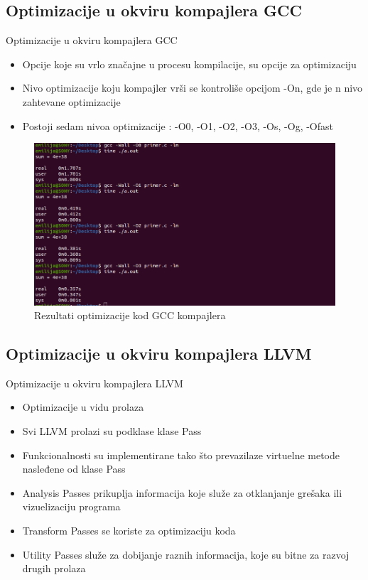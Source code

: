 \documentclass[compress, containsverbatim,mathserif, xcolor=dvipsnames, unicode]{beamer}
\begin{document}
\subsection{Optimizacije u okviru kompajlera GCC}
\begin{frame}{Optimizacije u okviru kompajlera GCC}
    \begin{itemize}
        \item Opcije koje su vrlo značajne u procesu kompilacije, su opcije za optimizaciju
        \item Nivo optimizacije koju kompajler vrši se kontroliše
opcijom -On, gde je n nivo zahtevane optimizacije
        \item Postoji sedam nivoa optimizacije : -O0, -O1, -O2, -O3, -Os, -Og, -Ofast
    \end{itemize}
     \begin{figure}[h!]
        \begin{center}
       \includegraphics[scale = 0.3]{../pics/test.png}
       \end{center}
       \caption{Rezultati optimizacije kod GCC kompajlera}
    \end{figure}    
\end{frame}

\subsection{Optimizacije u okviru kompajlera LLVM}
\begin{frame}{Optimizacije u okviru kompajlera LLVM}
    \begin{itemize}
        \item Optimizacije u vidu prolaza
        \item Svi LLVM prolazi su podklase klase Pass
        \item Funkcionalnosti su implementirane tako što prevazilaze virtuelne metode nasleđene od klase Pass
        \item Analysis Passes prikuplja informacija koje 
služe za otklanjanje grešaka ili vizuelizaciju programa
        \item Transform Passes se koriste za optimizaciju koda
        \item Utility Passes služe za dobijanje raznih
informacija, koje su bitne za razvoj drugih prolaza
    \end{itemize}    
\end{frame}
\end{document}
